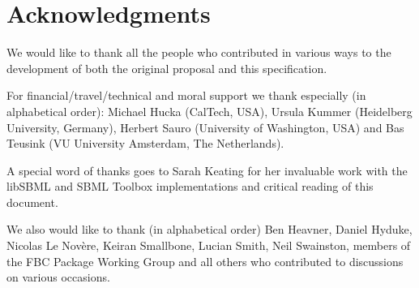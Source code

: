 
\section{Acknowledgments}

We would like to thank all the people who contributed in various ways to the development of both the original proposal and this specification.

For financial/travel/technical and moral support we thank especially (in alphabetical order): Michael Hucka (CalTech, USA), Ursula Kummer (Heidelberg University, Germany), Herbert Sauro (University of Washington, USA) and Bas Teusink (VU University Amsterdam, The Netherlands).

A special word of thanks goes to Sarah Keating for her invaluable work with the \textsf{libSBML} and \textsf{SBML Toolbox} implementations and critical reading of this document.

We also would like to thank (in alphabetical order) Ben Heavner, Daniel Hyduke, Nicolas Le Nov\`{e}re, Keiran Smallbone, Lucian Smith, Neil Swainston, members of the \textsf{FBC Package Working Group} and all others who contributed to discussions on various occasions.

